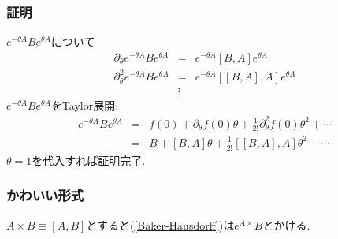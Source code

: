 \documentclass[10.5pt,a4paper]{jreport}
\begin{document}
\subsubsection{証明}
$e^{-\theta A}Be^{\theta A}$について
\begin{eqnarray}
  \partial_\theta e^{-\theta A}Be^{\theta A} &=& e^{-\theta A}[B, A]e^{\theta A}\\
  \partial_\theta^2 e^{-\theta A}Be^{\theta A} &=& e^{-\theta A}[[B, A], A]e^{\theta A}\\
  \nonumber&\vdots&
\end{eqnarray}
$e^{-\theta A}Be^{\theta A}$をTaylor展開:
\begin{eqnarray}
  e^{-\theta A}Be^{\theta A} &=& f(0) + \partial_\theta f(0)\theta + \frac{1}{2!}\partial^2_\theta f(0)\theta^2 + \cdots\\
  &=& B + [B, A]\theta + \frac{1}{2!}[[B, A], A]\theta^2 + \cdots\label{Baker-Hausdorff}
\end{eqnarray}
$\theta = 1$を代入すれば証明完了.
\subsubsection{かわいい形式}
$A\times B\equiv [A, B]$とすると(\ref{Baker-Hausdorff})は$e^{A\times}B$とかける. 
\end{document}
